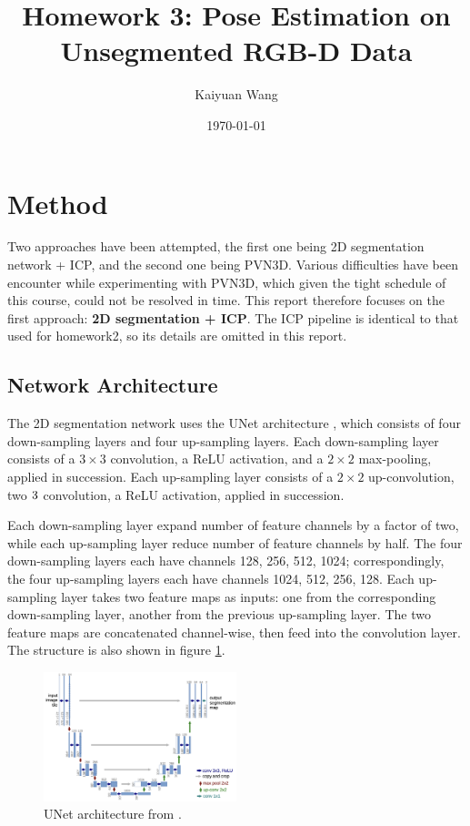 \documentclass{article}
\title{Homework 3: Pose Estimation on Unsegmented RGB-D Data}
\author{Kaiyuan Wang}
\date{\today}
\begin{document}
\maketitle


\section{Method}

Two approaches have been attempted, the first one being 2D segmentation network + ICP, 
and the second one being PVN3D. Various difficulties have been encounter while experimenting
with PVN3D, which given the tight schedule of this course, could not be resolved in time.
This report therefore focuses on the first approach: \textbf{2D segmentation + ICP}. The 
ICP pipeline is identical to that used for homework2, so its details are omitted in this report.

\subsection{Network Architecture}   %

The 2D segmentation network uses the UNet architecture \cite{unet}, which consists of 
four down-sampling layers and four up-sampling layers. Each down-sampling layer consists 
of a $3\times3$ convolution, a ReLU activation, and a $2\times2$ max-pooling, applied in succession. Each up-sampling layer consists of a $2\times2$ up-convolution, 
two $3\time3$ convolution, a ReLU activation, applied in succession. 

Each down-sampling layer expand number of feature channels by a factor of two, while
each up-sampling layer reduce number of feature channels by half. The four down-sampling layers each have channels 128, 256, 512, 1024; correspondingly, the four up-sampling layers
each have channels 1024, 512, 256, 128. Each up-sampling layer takes two feature maps as inputs: 
one from the corresponding down-sampling layer, another from the previous up-sampling layer. The 
two feature maps are concatenated channel-wise, then feed into the convolution layer. The structure 
is also shown  in figure \ref{fig:unet}.

\begin{figure}[H]\centering
    \includegraphics[width=0.5\textwidth]{unet_structure.png}
    \caption{UNet architecture from \cite{unet}.\label{fig:unet}}
\end{figure}
\pagebreak
\end{document}
